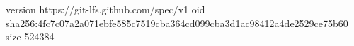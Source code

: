 version https://git-lfs.github.com/spec/v1
oid sha256:4fc7c07a2a071ebfe585c7519cba364cd099cba3d1ac98412a4de2529ce75b60
size 524384
